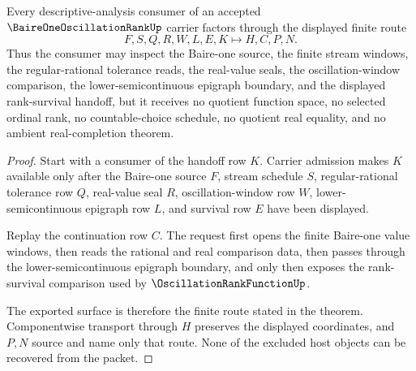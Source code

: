 \begin{theorem}
\label{thm:baire-one-oscillation-rank-constructive-handoff}
Every descriptive-analysis consumer of an accepted $\BaireOneOscillationRankUp$ carrier factors through the displayed finite route
$$
F,S,Q,R,W,L,E,K \longmapsto H,C,P,N .
$$
Thus the consumer may inspect the Baire-one source, the finite stream windows, the regular-rational tolerance reads, the real-value seals, the oscillation-window comparison, the lower-semicontinuous epigraph boundary, and the displayed rank-survival handoff, but it receives no quotient function space, no selected ordinal rank, no countable-choice schedule, no quotient real equality, and no ambient real-completion theorem.
\end{theorem}
\begin{proof}
Start with a consumer of the handoff row $K$. Carrier admission makes $K$ available only after the Baire-one source $F$, stream schedule $S$, regular-rational tolerance row $Q$, real-value seal $R$, oscillation-window row $W$, lower-semicontinuous epigraph row $L$, and survival row $E$ have been displayed.

Replay the continuation row $C$. The request first opens the finite Baire-one value windows, then reads the rational and real comparison data, then passes through the lower-semicontinuous epigraph boundary, and only then exposes the rank-survival comparison used by $\OscillationRankFunctionUp$.

The exported surface is therefore the finite route stated in the theorem. Componentwise transport through $H$ preserves the displayed coordinates, and $P,N$ source and name only that route. None of the excluded host objects can be recovered from the packet.
\end{proof}

\begin{closurestatus}{\BaireOneOscillationRankUp}
  \theoryclosure{\seedClosure}
  \formalstatus{\unformalizedV}
\end{closurestatus}
